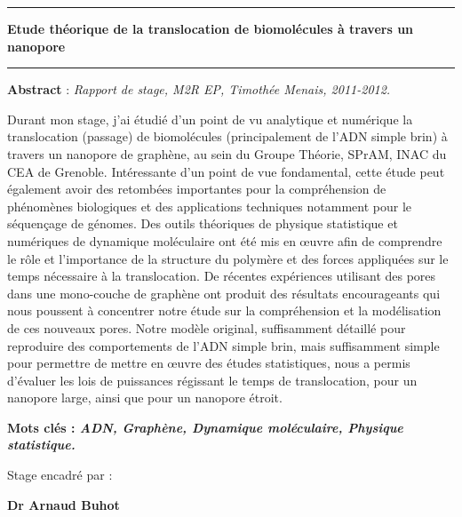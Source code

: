 \documentclass[a4paper,11pt]{article}
\begin{document}
\begin{center}

\vspace{1.5cm}

\rule[11pt]{5cm}{0.5pt}

\textbf{\huge Etude théorique de la translocation de
biomolécules à travers un nanopore}

\rule{5cm}{0.5pt}

\vspace{1.5cm}

\parbox{15cm}{\small
\textbf{Abstract} : \it Rapport de stage, M2R EP, Timothée Menais, 2011-2012.

\vspace{0.5cm}
\rm Durant mon stage, j'ai étudié d'un point de vu analytique et numérique la translocation (passage) de biomolécules (principalement de l'ADN simple brin) à travers un nanopore de graphène, au sein du Groupe Théorie, SPrAM, INAC du CEA de Grenoble. Intéressante d'un point de vue fondamental, cette étude peut également avoir des retombées importantes pour la compréhension de phénomènes biologiques et des applications techniques notamment pour le séquençage de génomes. Des outils théoriques de physique statistique et numériques de dynamique moléculaire ont été mis en œuvre afin de comprendre le rôle et l'importance de la structure du polymère et des forces appliquées sur le temps nécessaire à la translocation. De récentes expériences utilisant des pores dans une mono-couche de graphène ont produit des résultats encourageants qui nous poussent à concentrer notre étude sur la compréhension et la modélisation de ces nouveaux pores. Notre modèle original, suffisamment détaillé pour reproduire des comportements de l'ADN simple brin, mais suffisamment simple pour permettre de mettre en œuvre des études statistiques, nous a permis d'évaluer les lois de puissances régissant le temps de translocation, pour un nanopore large, ainsi que pour un nanopore étroit.
} %


\vspace{0.5cm}

\parbox{15cm}{
\textbf{Mots clés : \it ADN, Graphène, Dynamique moléculaire, Physique statistique.} }%

\vspace{0.5cm}

\parbox{15cm}{
Stage encadré par :

{\bf Dr Arnaud Buhot }

}
\end{center}
\end{document}
